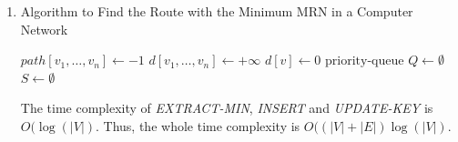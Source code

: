 \documentclass[12pt,a4paper]{article}
\makeatletter
\newtheorem*{solution}{Solution}
\theoremstyle{definition}
\renewenvironment{solution}[1][Solution] {\par\pushQED{\qed}\normalfont\topsep6\p@\@plus6\p@\relax\trivlist\item[\hskip\labelsep\bfseries#1\@addpunct{.}]\ignorespaces}{\popQED\endtrivlist\@endpefalse} \makeatother
\makeatother
\begin{document}
\begin{enumerate}
\begin{solution}
    \begin{minipage}[t]{0.9\textwidth}
        \begin{algorithm}[H]
        
        \BlankLine
        \caption{Algorithm to Find the Route with the Minimum MRN in a Computer Network}
        \label{Alg-route}
        $path[v_1,\dots,v_n]\leftarrow -1$\;
        $d[v_1,\dots,v_n]\leftarrow +\infty$\;
        $d[v]\leftarrow 0$\;
        $\text{priority-queue } Q\leftarrow \emptyset$\;
        $S\leftarrow\emptyset$\;
        \end{algorithm}
    \end{minipage}
    
    The time complexity of \emph{EXTRACT-MIN}, \emph{INSERT} and \emph{UPDATE-KEY} is $O(\log(|V|)$. Thus, the whole time complexity is $O((|V|+|E|)\log(|V|)$.
    \end{solution}
	

\end{enumerate}
\end{document}
